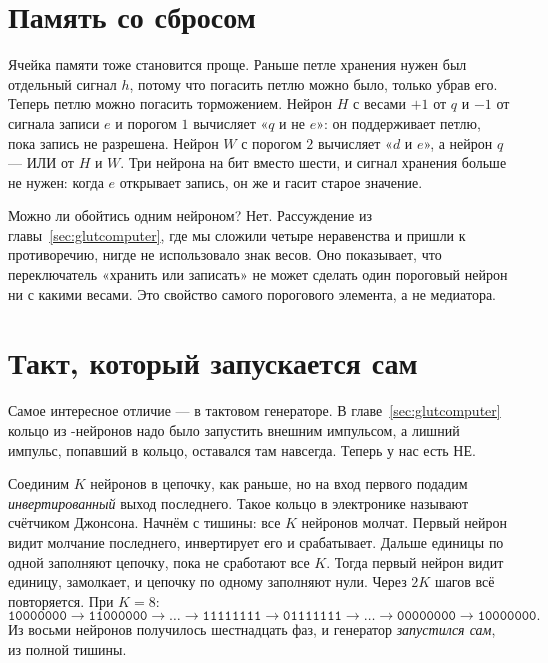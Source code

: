 \section{Память со сбросом}

Ячейка памяти тоже становится проще. Раньше петле хранения нужен был отдельный сигнал $h$, потому что погасить петлю можно было, только убрав его. Теперь петлю можно погасить торможением. Нейрон $H$ с весами $+1$ от $q$ и $-1$ от сигнала записи $e$ и порогом $1$ вычисляет «$q$ и не $e$»: он поддерживает петлю, пока запись не разрешена. Нейрон $W$ с порогом $2$ вычисляет «$d$ и $e$», а нейрон $q$ --- ИЛИ от $H$ и $W$. Три нейрона на бит вместо шести, и сигнал хранения больше не нужен: когда $e$ открывает запись, он же и гасит старое значение.

Можно ли обойтись одним нейроном? Нет. Рассуждение из главы~\ref{sec:glutcomputer}, где мы сложили четыре неравенства и пришли к противоречию, нигде не использовало знак весов. Оно показывает, что переключатель «хранить или записать» не может сделать один пороговый нейрон ни с какими весами. Это свойство самого порогового элемента, а не медиатора.

\section{Такт, который запускается сам}
\label{sec:johnson}

Самое интересное отличие --- в тактовом генераторе. В главе~\ref{sec:glutcomputer} кольцо из -нейронов надо было запустить внешним импульсом, а лишний импульс, попавший в кольцо, оставался там навсегда. Теперь у нас есть НЕ.

Соединим $K$ нейронов в цепочку, как раньше, но на вход первого подадим \emph{инвертированный} выход последнего. Такое кольцо в электронике называют счётчиком Джонсона. Начнём с тишины: все $K$ нейронов молчат. Первый нейрон видит молчание последнего, инвертирует его и срабатывает. Дальше единицы по одной заполняют цепочку, пока не сработают все $K$. Тогда первый нейрон видит единицу, замолкает, и цепочку по одному заполняют нули. Через $2K$ шагов всё повторяется. При $K=8$:
\[
\texttt{10000000}\to\texttt{11000000}\to\dots\to\texttt{11111111}\to\texttt{01111111}\to\dots\to\texttt{00000000}\to\texttt{10000000}.
\]
Из восьми нейронов получилось шестнадцать фаз, и генератор \emph{запустился сам}, из полной тишины.

